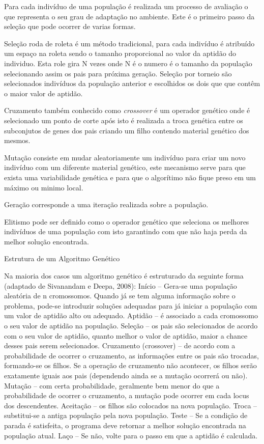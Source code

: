 \documentclass{abntpuc}
\begin{document}
Para cada indivíduo de uma população é realizada um processo de avaliação o que representa o seu grau de adaptação no ambiente. Este é o primeiro passo da seleção que pode ocorrer de varias formas.\par

Seleção roda de roleta é um método tradicional, para cada indivíduo é atribuído um espaço na roleta sendo o tamanho proporcional ao valor da aptidão do individuo. Esta role gira N vezes onde N é o numero é o tamanho da população selecionando assim os pais para próxima geração. Seleção por torneio são selecionados indivíduos da população anterior e escolhidos os dois que que contêm o maior valor de aptidão.\par

Cruzamento também conhecido como \textit{crossover} é um operador genético onde é selecionado um ponto de corte após isto é realizada a troca genética entre os subconjutos de genes dos pais criando um filho contendo material genético dos mesmos.

Mutação consiste em mudar aleatoriamente um indivíduo para criar um novo indivíduo com um diferente material genético, este mecanismo serve para que exista uma variabilidade genética e para que o algorítimo não fique preso em um máximo ou minimo local.

Geração corresponde a uma iteração realizada sobre a população.

Elitismo pode ser definido como o operador genético que seleciona os melhores indivíduos de uma população com isto garantindo com que não haja perda da melhor solução encontrada.



 Estrutura de um Algoritmo Genético 
 
Na maioria dos casos um algoritmo genético é estruturado da seguinte forma 
(adaptado de Sivanandam e Deepa, 2008): 
Início – Gera-se uma população aleatória de n cromossomos. Quando já se tem 
alguma informação sobre o problema, pode-se introduzir soluções adequadas para já iniciar a 
população com um valor de aptidão alto ou adequado. 
Aptidão – é associado a cada cromossomo o seu valor de aptidão na população. 
Seleção – os pais são selecionados de acordo com o seu valor de aptidão, quanto 
melhor o valor de aptidão, maior a chance desses pais serem selecionados. 
Cruzamento (crossover) – de acordo com a probabilidade de ocorrer o cruzamento, 
as informações entre os pais são trocadas, formando-se os filhos. Se a operação de 
cruzamento não acontecer, os filhos serão exatamente iguais aos pais (dependendo ainda se a 
mutação ocorrerá ou não). 
Mutação – com certa probabilidade, geralmente bem menor do que a probabilidade de 
ocorrer o cruzamento, a mutação pode ocorrer em cada locus dos descendentes. 
Aceitação – os filhos são colocados na nova população. 
Troca – substitui-se a antiga população pela nova população. 
Teste – Se a condição de parada é satisfeita, o programa deve retornar a melhor 
solução encontrada na população atual. 
Laço – Se não, volte para o passo em que a aptidão é calculada. 
\end{document}

